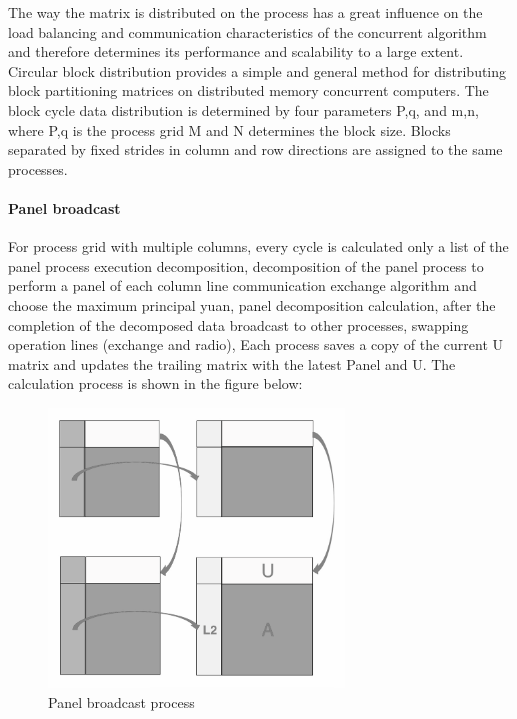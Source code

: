\documentclass[a4paper,12pt]{article}
\begin{document}
The way the matrix is distributed on the process has a great influence on the load balancing and communication characteristics of the concurrent algorithm and therefore determines its performance and scalability to a large extent. Circular block distribution provides a simple and general method for distributing block partitioning matrices on distributed memory concurrent computers. The block cycle data distribution is determined by four parameters P,q, and m,n, where P,q is the process grid M and N determines the block size. Blocks separated by fixed strides in column and row directions are assigned to the same processes.

\paragraph{Panel broadcast}

For process grid with multiple columns, every cycle is calculated only a list of the panel process execution decomposition, decomposition of the panel process to perform a panel of each column line communication exchange algorithm and choose the maximum principal yuan, panel decomposition calculation, after the completion of the decomposed data broadcast to other processes, swapping operation lines (exchange and radio), Each process saves a copy of the current U matrix and updates the trailing matrix with the latest Panel and U. The calculation process is shown in the figure below:

\begin{figure}[H]
    \centering
    \includegraphics[width=0.7\textwidth]{Panel_broadcast_process.png}
    \caption{Panel broadcast process}
    \label{fig:panel_broadcast}
\end{figure}
\end{document}
